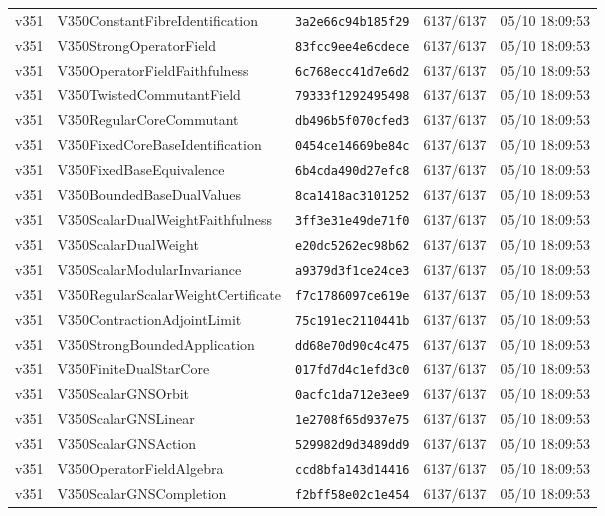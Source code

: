 \documentclass[11pt]{article}
\theoremstyle{definition}\newtheorem{deriv}{Derivação}
\begin{document}
{\begin{longtable}{@{}lllll@{}}
v351 & V350ConstantFibreIdentification & \texttt{3a2e66c94b185f29} & 6137/6137 & 05/10 18:09:53 \\
v351 & V350StrongOperatorField & \texttt{83fcc9ee4e6cdece} & 6137/6137 & 05/10 18:09:53 \\
v351 & V350OperatorFieldFaithfulness & \texttt{6c768ecc41d7e6d2} & 6137/6137 & 05/10 18:09:53 \\
v351 & V350TwistedCommutantField & \texttt{79333f1292495498} & 6137/6137 & 05/10 18:09:53 \\
v351 & V350RegularCoreCommutant & \texttt{db496b5f070cfed3} & 6137/6137 & 05/10 18:09:53 \\
v351 & V350FixedCoreBaseIdentification & \texttt{0454ce14669be84c} & 6137/6137 & 05/10 18:09:53 \\
v351 & V350FixedBaseEquivalence & \texttt{6b4cda490d27efc8} & 6137/6137 & 05/10 18:09:53 \\
v351 & V350BoundedBaseDualValues & \texttt{8ca1418ac3101252} & 6137/6137 & 05/10 18:09:53 \\
v351 & V350ScalarDualWeightFaithfulness & \texttt{3ff3e31e49de71f0} & 6137/6137 & 05/10 18:09:53 \\
v351 & V350ScalarDualWeight & \texttt{e20dc5262ec98b62} & 6137/6137 & 05/10 18:09:53 \\
v351 & V350ScalarModularInvariance & \texttt{a9379d3f1ce24ce3} & 6137/6137 & 05/10 18:09:53 \\
v351 & V350RegularScalarWeightCertificate & \texttt{f7c1786097ce619e} & 6137/6137 & 05/10 18:09:53 \\
v351 & V350ContractionAdjointLimit & \texttt{75c191ec2110441b} & 6137/6137 & 05/10 18:09:53 \\
v351 & V350StrongBoundedApplication & \texttt{dd68e70d90c4c475} & 6137/6137 & 05/10 18:09:53 \\
v351 & V350FiniteDualStarCore & \texttt{017fd7d4c1efd3c0} & 6137/6137 & 05/10 18:09:53 \\
v351 & V350ScalarGNSOrbit & \texttt{0acfc1da712e3ee9} & 6137/6137 & 05/10 18:09:53 \\
v351 & V350ScalarGNSLinear & \texttt{1e2708f65d937e75} & 6137/6137 & 05/10 18:09:53 \\
v351 & V350ScalarGNSAction & \texttt{529982d9d3489dd9} & 6137/6137 & 05/10 18:09:53 \\
v351 & V350OperatorFieldAlgebra & \texttt{ccd8bfa143d14416} & 6137/6137 & 05/10 18:09:53 \\
v351 & V350ScalarGNSCompletion & \texttt{f2bff58e02c1e454} & 6137/6137 & 05/10 18:09:53 \\

\end{longtable}}
\end{document}
